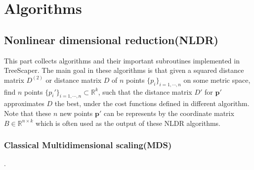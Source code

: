 \documentclass[11pt,a4paper]{article}
\theoremstyle{definition}
\theoremstyle{definition}
\numberwithin{equation}{section}
\begin{document}
	\section{Algorithms}
	
	\subsection{Nonlinear dimensional reduction(NLDR)}
	
	This part collects algorithms and their important subroutines implemented in TreeScaper. The main goal in these algorithms is that given a squared distance matrix $D^{(2)}$ or distance matrix $D$ of $n$ points $\{p_i\}_{i=1,\cdots, n}$ on some metric space, find $n$ points $\{p_i'\}_{i=1,\cdots,n}\subset \mathbb{R}^k$, such that the distance matrix $D'$ for $\mathbf{p}'$ approximates $D$ the best, under the cost functions defined in different algorithm. Note that these $n$ new points $\mathbf{p}'$ can be represents by the coordinate matrix $B\in \mathbb{R}^{n\times k}$ which is often used as the output of these NLDR algorithms.
	
	\subsubsection{Classical Multidimensional scaling(MDS)}.
	
\end{document}
